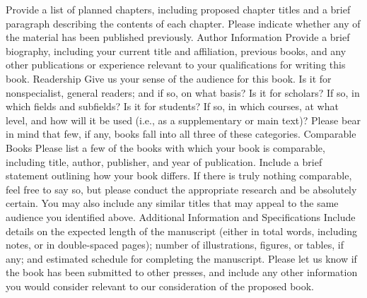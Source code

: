 Provide a list of planned chapters, including proposed chapter titles and a brief paragraph describing the contents of each chapter. Please indicate whether any of the material has been published previously.
Author Information
Provide a brief biography, including your current title and affiliation, previous books, and any other publications or experience relevant to your qualifications for writing this book.
Readership
Give us your sense of the audience for this book. Is it for nonspecialist, general readers; and if so, on what basis? Is it for scholars? If so, in which fields and subfields? Is it for students? If so, in which courses, at what level, and how will it be used (i.e., as a supplementary or main text)? Please bear in mind that few, if any, books fall into all three of these categories.
Comparable Books
Please list a few of the books with which your book is comparable, including title, author, publisher, and year of publication. Include a brief statement outlining how your book differs. If there is truly nothing comparable, feel free to say so, but please conduct the appropriate research and be absolutely certain. You may also include any similar titles that may appeal to the same audience you identified above.
Additional Information and Specifications
Include details on the expected length of the manuscript (either in total words, including notes, or in double-spaced pages); number of illustrations, figures, or tables, if any; and estimated schedule for completing the manuscript. Please let us know if the book has been submitted to other presses, and include any other information you would consider relevant to our consideration of the proposed book.